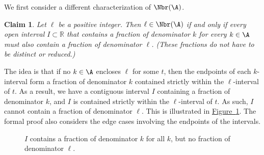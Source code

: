 \documentclass[11pt]{article}
\numberwithin{equation}{section}
\newtheorem{claim}[theorem]{Claim}
\theoremstyle{definition}
\theoremstyle{plain}
\newcommand{\expref}[2]{\hyperref[#2]{#1~\ref{#2}}}
\begin{document}
We first consider a different characterization of $\Nbr(\A)$.

\begin{claim}
    \label{claim:intervalcondition}
    Let $\ell$ be a positive integer. Then $\ell\in \Nbr(\A)$ if and only if every open interval $I\subset \mathbb{R}$ that contains a fraction of denominator $k$ for every $k\in \A$ must also contain a fraction of denominator $\ell$. (These fractions do not have to be distinct or reduced.)
\end{claim}

The idea is that if no $k\in \A$ encloses $\ell$ for some $t$, then the endpoints of each $k$-interval form a fraction of denominator $k$ contained strictly within the $\ell$-interval of $t$. As a result, we have a contiguous interval $I$ containing a fraction of denominator $k$, and $I$ is contained strictly within the $\ell$-interval of $t$. As such, $I$ cannot contain a fraction of denominator $\ell$. This is illustrated in \expref{Figure}{fig:intervalcondition}. The formal proof also considers the edge cases involving the endpoints of the intervals.

\begin{figure}[ht]
    \centering
    \caption{$I$ contains a fraction of denominator $k$ for all $k$, but no fraction of denominator $\ell$.}
    \label{fig:intervalcondition}
\end{figure}
\end{document}
